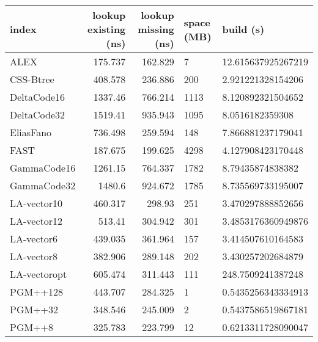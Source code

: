 \begin{tabular}{lrrll}
\hline
 index             &   lookup existing (ns) &   lookup missing (ns) & space (MB)   & build (s)            \\
\hline
 ALEX              &                175.737 &              162.829  & 7            & 12.615637925267219   \\
 CSS-Btree         &                408.578 &              236.886  & 200          & 2.921221328154206    \\
 DeltaCode16       &               1337.46  &              766.214  & 1113         & 8.120892321504652    \\
 DeltaCode32       &               1519.41  &              935.943  & 1095         & 8.0516182359308      \\
 EliasFano         &                736.498 &              259.594  & 148          & 7.866881237179041    \\
 FAST              &                187.675 &              199.625  & 4298         & 4.127908423170448    \\
 GammaCode16       &               1261.15  &              764.337  & 1782         & 8.79435874838382     \\
 GammaCode32       &               1480.6   &              924.672  & 1785         & 8.735569733195007    \\
 LA-vector10       &                460.317 &              298.93   & 251          & 3.470297888852656    \\
 LA-vector12       &                513.41  &              304.942  & 301          & 3.4853176360949876   \\
 LA-vector6        &                439.035 &              361.964  & 157          & 3.414507610164583    \\
 LA-vector8        &                382.906 &              289.148  & 202          & 3.430257202684879    \\
 LA-vectoropt      &                605.474 &              311.443  & 111          & 248.7509241387248    \\
 PGM++128          &                443.707 &              284.325  & 1            & 0.5435256343334913   \\
 PGM++32           &                348.546 &              245.009  & 2            & 0.5437586519867181   \\
 PGM++8            &                325.783 &              223.799  & 12           & 0.6213311728090047   \\

\end{tabular}
